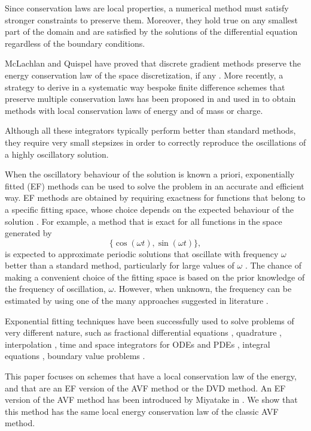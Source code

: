 \documentclass[twoside]{article}
\numberwithin{equation}{section}
\begin{document}
Since conservation laws are local properties, a numerical method must satisfy stronger constraints to preserve them. Moreover, they hold true on any smallest part of the domain and are satisfied by the solutions of the differential equation regardless of the boundary conditions. 

McLachlan and Quispel have proved that discrete gradient methods preserve the energy conservation law of the space discretization, if any \cite{McLachlan}.
More recently, a strategy to derive in a systematic way bespoke finite difference schemes that preserve multiple conservation laws has been proposed in \cite{Frasca-Caccia2021,IMA} and used in \cite{Frasca-Caccia2021,IMA,mKdV,AMC} to obtain methods with local conservation laws of energy and of mass or charge. 

Although all these integrators typically perform better than standard methods, they require very small stepsizes in order to correctly reproduce the oscillations of a highly oscillatory solution.

When the oscillatory behaviour of the solution is known a priori, exponentially fitted (EF) methods can be used to solve the problem in an accurate and efficient way. EF methods are obtained by requiring exactness for functions that belong to a specific fitting space, whose choice depends on the expected behaviour of the solution \cite{Pater,Ixaru}. For example, a method that is exact for all functions in the space generated by
$$\{\cos(\omega t),\sin(\omega t)\},$$
is expected to approximate periodic solutions that oscillate with frequency $\omega$ better than a standard method, particularly for large values of $\omega$ \cite{Miya}.  The chance of making a convenient choice of the fitting space is based on the prior knowledge of the frequency of oscillation, $\omega$.  However, when unknown, the frequency can be estimated by using one of the many approaches suggested in literature \cite{DEP,VIM,VanDaele}.

Exponential fitting techniques have been successfully used to solve problems of very different nature, such as fractional differential equations \cite{BCDP}, quadrature \cite{CPquad,EW,ConteJCAM}, interpolation \cite{MVB}, time and space integrators for ODEs \cite{Conte1,Simos,Conte2} and PDEs \cite{CFC,DP,Card}, integral equations \cite{CIP,CIPS}, boundary value problems \cite{VanD}.

This paper focuses on schemes that have a local conservation law of the energy, and that are an EF version of the AVF method or the DVD method. An EF version of the AVF method has been introduced by Miyatake in \cite{Miya}. We show that this method has the same local energy conservation law of the classic AVF method.
\end{document}
